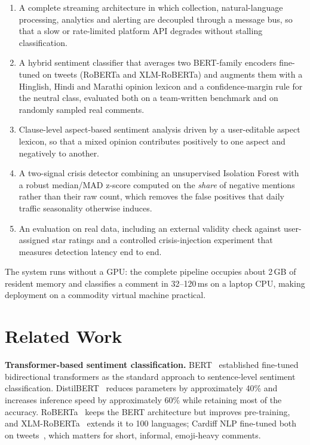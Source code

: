 \documentclass[conference]{IEEEtran}
\begin{document}
\begin{enumerate}
\item A complete streaming architecture in which collection, natural-language
processing, analytics and alerting are decoupled through a message bus, so that a slow or
rate-limited platform API degrades without stalling classification.
\item A hybrid sentiment classifier that averages two BERT-family encoders fine-tuned on
tweets (RoBERTa and XLM-RoBERTa) and augments them with a Hinglish, Hindi and Marathi
opinion lexicon and a confidence-margin rule for the neutral class, evaluated both on a
team-written benchmark and on randomly sampled real comments.
\item Clause-level aspect-based sentiment analysis driven by a user-editable aspect
lexicon, so that a mixed opinion contributes positively to one aspect and negatively to
another.
\item A two-signal crisis detector combining an unsupervised Isolation Forest with a
robust median/MAD z-score computed on the \emph{share} of negative mentions rather than
their raw count, which removes the false positives that daily traffic seasonality
otherwise induces.
\item An evaluation on real data, including an external validity check against
user-assigned star ratings and a controlled crisis-injection experiment that measures
detection latency end to end.
\end{enumerate}

The system runs without a GPU: the complete pipeline occupies about 2\,GB of
resident memory and classifies a comment in 32--120\,ms on a laptop CPU, making deployment
on a commodity virtual machine practical.

\section{Related Work}

\textbf{Transformer-based sentiment classification.} BERT~\cite{devlin2019bert}
established fine-tuned bidirectional transformers as the standard approach to
sentence-level sentiment classification. DistilBERT~\cite{sanh2019distilbert} reduces
parameters by approximately 40\% and increases inference speed by approximately 60\%
while retaining most of the accuracy. RoBERTa~\cite{liu2019roberta} keeps the BERT
architecture but improves pre-training, and XLM-RoBERTa~\cite{conneau2020xlmr} extends it to
100 languages; Cardiff NLP fine-tuned both on tweets~\cite{barbieri2022xlmt,loureiro2022timelms},
which matters for short, informal, emoji-heavy comments.
\end{document}
